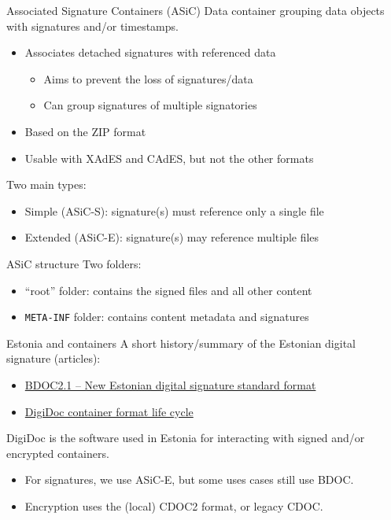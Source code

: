 \begin{frame}{Associated Signature Containers (ASiC)}
  Data container grouping data objects with signatures and/or timestamps.
  \begin{itemize}[<+(1)->]
    \item Associates detached signatures with referenced data
    \begin{itemize}
      \item Aims to prevent the loss of signatures/data
      \item Can group signatures of multiple signatories
    \end{itemize}
    \item Based on the ZIP format
    \item Usable with XAdES and CAdES, but not the other formats
  \end{itemize}

  \vspace*{1em}

  \pause
  Two main types:
  \begin{itemize}[<+(1)->]
    \item Simple (ASiC-S): signature(s) must reference only a single file
    \item Extended (ASiC-E): signature(s) may reference multiple files
  \end{itemize}
\end{frame}

\begin{frame}{ASiC structure}
  Two folders:
  \begin{itemize}[<+(1)->]
    \item \enquote{root} folder: contains the signed files and all other content
    \item \texttt{META-INF} folder: contains content metadata and signatures
  \end{itemize}
\end{frame}

\begin{frame}{Estonia and containers}
  A short history/summary of the Estonian digital signature (articles):
  \begin{itemize}
    \item \href{https://www.id.ee/en/article/bdoc2-1-new-estonian-digital-signature-standard-format/}{BDOC2.1 -- New Estonian digital signature standard format}
    \item \href{https://www.id.ee/en/article/digidoc-container-format-life-cycle-2/}{DigiDoc container format life cycle}
  \end{itemize}

  \vspace*{1em}

  \pause
  DigiDoc is the software used in Estonia for interacting with signed and/or encrypted containers.
  \begin{itemize}
    \item For signatures, we use ASiC-E, but some uses cases still use BDOC.
    \item Encryption uses the (local) CDOC2 format, or legacy CDOC.
  \end{itemize}
\end{frame}

